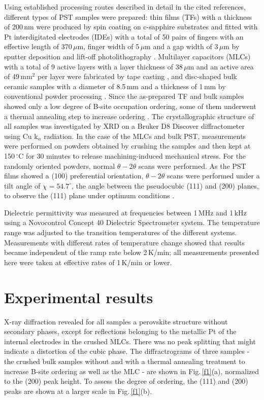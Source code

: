 \documentclass[%
 preprint, %
 amsmath,amssymb,
 aps, physrev,
]{revtex4-2}
\begin{document}
Using established processing routes described in detail in the cited references, different types of PST samples were prepared: thin films (TFs) with a thickness of 200\,nm were produced by spin coating on c-sapphire substrates and fitted with Pt interdigitated electrodes (IDEs) with a total of 50 pairs of fingers with an effective length of 370\,$\mu$m, finger width of 5\,$\mu$m and a gap width of 3\,$\mu$m by sputter deposition and lift-off photolithography \cite{Aravindhan24}. Multilayer capacitors (MLCs) with a total of 9 active layers with a layer thickness of 38\,$\mu$m and an active area of 49\,mm$^2$ per layer were fabricated by tape casting \cite{Torello20}, and disc-shaped bulk ceramic samples with a diameter of 8.5\,mm and a thickness of 1\,mm by conventional powder processing \cite{Aso19}. Since the as-prepared TF and bulk samples showed only a low degree of B-site occupation ordering, some of them underwent a thermal annealing step to increase ordering \cite{Aso19}. The crystallographic structure of all samples was investigated by XRD on a Bruker D8 Discover diffractometer using Cu k$_{\alpha}$ radiation. In the case of the MLCs and bulk PST, measurements were performed on powders obtained by crushing the samples and then kept at 150\,$^{\circ}$C for 30 minutes to release machining-induced mechanical stress. For the randomly oriented powders, normal $\theta-2\theta$ scans were performed. As the PST films showed a (100) preferential orientation, $\theta-2\theta$ scans were performed under a tilt angle of $\chi = 54.7^{\circ}$, the angle between the pseudocubic (111) and (200) planes, to observe the (111) plane under optimum conditions \cite{Aravindhan24}.

Dielectric permittivity was measured at frequencies between 1\,MHz and 1\,kHz using a Novocontrol Concept 40 Dielectric Spectrometer system. The temperature range was adjusted to the transition temperatures of the different systems. Measurements with different rates of temperature change showed that results became independent of the ramp rate below 2\,K/min; all measurements presented here were taken at effective rates of 1\,K/min or lower.

\section{Experimental results}

X-ray diffraction revealed for all samples a perovskite structure without secondary phases, except for reflections belonging to the metallic Pt of the internal electrodes in the crushed MLCs. There was no peak splitting that might indicate a distortion of the cubic phase. The diffractrograms of three samples - the crushed bulk samples without and with a thermal annealing treatment to increase B-site ordering as well as the MLC - are shown in Fig.\,\ref{f1}(a), normalized to the (200) peak height. To assess the degree of ordering, the (111) and (200) peaks are shown at a larger scale in Fig.\,\ref{f1}(b).
\end{document}
